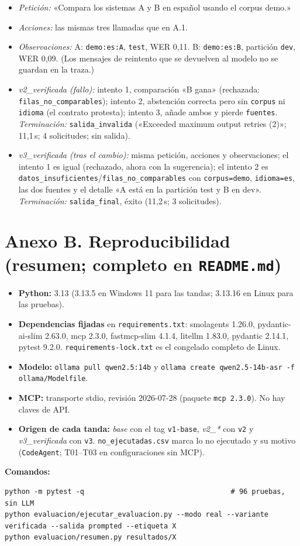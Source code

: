 \documentclass[10pt,a4paper]{article}
\newcommand{\cod}[1]{\texttt{\small #1}}
\begin{document}
\begin{itemize}
\item \emph{Petición:} «Compara los sistemas A y B en español usando el corpus demo.»
\item \emph{Acciones:} las mismas tres llamadas que en A.1.
\item \emph{Observaciones:} A: \cod{demo:es:A}, \cod{test}, WER 0,11. B: \cod{demo:es:B}, partición \cod{dev}, WER 0,09. (Los mensajes de reintento que se devuelven al modelo no se guardan en la traza.)
\item \emph{v2\_verificada (fallo):} intento 1, comparación «B gana» (rechazada: \cod{filas\_no\_comparables}); intento 2, abstención correcta pero sin \cod{corpus} ni \cod{idioma} (el contrato protesta); intento 3, añade ambos y pierde \cod{fuentes}. \emph{Terminación:} \cod{salida\_invalida} («Exceeded maximum output retries (2)»; 11,1\,s; 4 solicitudes; sin salida).
\item \emph{v3\_verificada (tras el cambio):} misma petición, acciones y observaciones; el intento 1 es igual (rechazado, ahora con la sugerencia); el intento 2 es \cod{datos\_insuficientes}/\cod{filas\_no\_comparables} con \cod{corpus=demo}, \cod{idioma=es}, las dos fuentes y el detalle «A está en la partición test y B en dev». \emph{Terminación:} \cod{salida\_final}, éxito (11,2\,s; 3 solicitudes).
\end{itemize}

\section*{Anexo B. Reproducibilidad (resumen; completo en \texttt{README.md})}
\begin{itemize}
\item \textbf{Python:} 3.13 (3.13.5 en Windows 11 para las tandas; 3.13.16 en Linux para las pruebas).
\item \textbf{Dependencias fijadas} en \cod{requirements.txt}: smolagents 1.26.0, pydantic-ai-slim 2.63.0, mcp 2.3.0, fastmcp-slim 4.1.4, litellm 1.83.0, pydantic 2.14.1, pytest 9.2.0. \cod{requirements-lock.txt} es el congelado completo de Linux.
\item \textbf{Modelo:} \cod{ollama pull qwen2.5:14b} y \cod{ollama create qwen2.5-14b-asr -f ollama/Modelfile}.
\item \textbf{MCP:} transporte stdio, revisión 2026-07-28 (paquete \cod{mcp 2.3.0}). No hay claves de API.
\item \textbf{Origen de cada tanda:} \emph{base} con el tag \cod{v1-base}, \emph{v2\_*} con \cod{v2} y \emph{v3\_verificada} con \cod{v3}. \cod{no\_ejecutadas.csv} marca lo no ejecutado y su motivo (\cod{CodeAgent}; T01--T03 en configuraciones sin MCP).
\end{itemize}
\textbf{Comandos:}
\begin{lstlisting}
python -m pytest -q                                   # 96 pruebas, sin LLM
python evaluacion/ejecutar_evaluacion.py --modo real --variante verificada --salida prompted --etiqueta X
python evaluacion/resumen.py resultados/X
\end{lstlisting}
\end{document}
